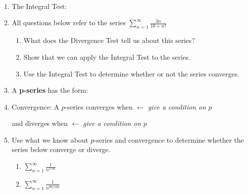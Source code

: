 \documentclass[11pt,fleqn]{article}
\begin{document}
\renewcommand{\headrulewidth}{0pt}
\newcommand{\blank}[1]{\rule{#1}{0.75pt}}
\newcommand{\bc}{\begin{center}}
\newcommand{\ec}{\end{center}}


\vspace*{-0.7in}

\begin{center}
  \large
  \\
   
\end{center}
\begin{enumerate}
\item The Integral Test:
\vfill
\item All questions below refer to the series $\displaystyle{\sum_{n=1}^\infty \frac{3n}{10+n^2}}$
	\begin{enumerate}
	\item What does the Divergence Test tell us about this series?
	\vspace{.7in}
	\item Show that we can apply the Integral Test to the series.
	\vspace{.7in}
	\item Use the Integral Test to determine whether or not the series converges.
	\vfill
	\end{enumerate}

\item A \textbf{p-series} has the form: \\
\vspace{0.75in}

\clearpage \newpage
\item Convergence:  A $p$-series converges when \underline{\phantom{sdfkjsdlakjf}} \hfill {\scriptsize $\leftarrow$ \emph{give a condition on $p$}}

\noindent and diverges when \underline{\phantom{sdfkjsdlakjf}} \hfill {\scriptsize $\leftarrow$ \emph{give a condition on $p$}}

\vspace{0.25in}

\item Use what we know about $p$-series and convergence to determine whether the series below converge or diverge.
	\begin{enumerate}
	\item  $\displaystyle{\sum_{n=1}^\infty \frac{1}{n^{1.56}}}$
	\vspace{.5in}
	\item  $\displaystyle{\sum_{n=1}^\infty \frac{1}{n^{99/100}}}$
	\vspace{.5in}
	\end{enumerate}


\end{enumerate}
\end{document}
